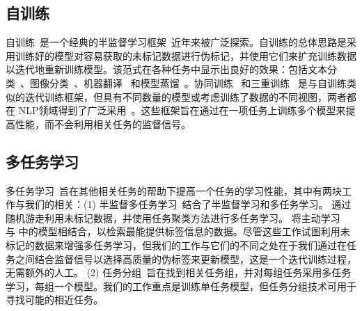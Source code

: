 \subsection{自训练}
自训练~\cite{scudder1965probability,Angluin1988-yw,Abney2002-qo,lee2013pseudo}是一个经典的半监督学习框架~\cite{chapelle2009semi}近年来被广泛探索。自训练的总体思路是采用训练好的模型对容易获取的未标记数据进行伪标记，并使用它们来扩充训练数据以迭代地重新训练模型。该范式在各种任务中显示出良好的效果：包括文本分类~\cite{mukherjee2020uncertainty,wang2020adaptive}、图像分类~\cite{xie2020self,zoph2020rethinking}、机器翻译~\cite{he2019revisiting} 和模型蒸馏~\cite{mukherjee2020xtremedistil}。协同训练~\cite{blum1998combining} 和三重训练~\cite{zhou2005tri} 是与自训练类似的迭代训练框架，但具有不同数量的模型或考虑训练了数据的不同视图，两者都在 NLP领域得到了广泛采用~\cite{Mihalcea2004-ks,McClosky2006-mp,Wan2009-jq,Li2014-ie,Caragea2015-fm,Lee2021-uj,Wagner2021-qo}。这些框架旨在通过在一项任务上训练多个模型来提高性能，而不会利用相关任务的监督信号。

\subsection{多任务学习}
多任务学习~\cite{caruana1997multitask,yang2021survey}旨在其他相关任务的帮助下提高一个任务的学习性能，其中有两块工作与我们的相关：(1) 半监督多任务学习~\cite{liu2007semi,li2009active}结合了半监督学习和多任务学习。 \citet{liu2007semi} 通过随机游走利用未标记数据，并使用任务聚类方法进行多任务学习。 \citet{li2009active} 将主动学习~\cite{mackay1992information} 与 \citet{liu2007semi} 中的模型相结合，以检索最能提供标签信息的数据。尽管这些工作试图利用未标记的数据来增强多任务学习，但我们的工作与它们的不同之处在于我们通过在任务之间结合监督信号以选择高质量的伪标签来更新模型，这是一个迭代训练过程，无需额外的人工。 (2) 任务分组~\cite{kumar2012learning,standley2020tasks,fifty2021efficiently}旨在找到相关任务组，并对每组任务采用多任务学习，每组一个模型。我们的工作重点是训练单任务模型，但任务分组技术可用于寻找可能的相近任务。

